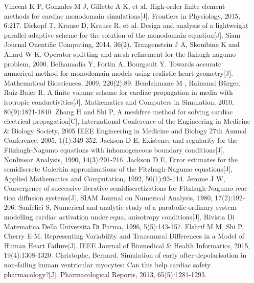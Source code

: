 \documentclass[twoside,UTF8]{nputhesis}
\begin{document}
\begin{thebibliography}{99}
	Vincent K P, Gonzales M J, Gillette A K, et al. High-order finite element methods for cardiac monodomain simulations[J]. Frontiers in Physiology, 2015, 6:217.
	Dickopf T, Krause D, Krause R, et al. Design and analysis of a lightweight parallel adaptive scheme for the solution of the monodomain equation[J]. Siam Journal Onentific Computing, 2014, 36(2).
	Trangenstein J A, Skouibine K and Allard W K, Operator splitting and mesh refinement for the ftzhugh-nagumo problem, 2000.
	Belhamadia Y, Fortin A, Bourgault Y. Towards accurate numerical method for monodomain models using realistic heart geometry[J]. Mathematical Biosciences, 2009, 220(2):89.
	Bendahmane M , Raimund Bürger, Ruiz-Baier R. A finite volume scheme for cardiac propagation in media with isotropic conductivities[J]. Mathematics and Computers in Simulation, 2010, 80(9):1821-1840.
	Zhang H and Shi P, A meshfree method for solving cardiac electrical propagation[C], International Conference of the Engineering in Medicine \& Biology Society, 2005 IEEE Engineering in Medicine and Biology 27th Annual Conference, 2005, 1(1):349-352.
	Jackson D E, Existence and regularity for the Fitzhugh-Nagumo equations with inhomogeneous
	boundary conditions[J], Nonlinear Analysis, 1990, 14(3):201-216.
	Jackson D E, Error estimates for the semidiscrete Galerkin approximations of the Fitzhugh-Nagumo equations[J], Applied Mathematics and Computation, 1992, 50(1):93-114.
	Jerome J W, Convergence of successive iterative semidiscretizations for Fitzhugh-Nagumo reac-
	tion diffusion systems[J], SIAM Journal on Numerical Analysis, 1980, 17(2):192-206.
	Sanfelici S, Numerical and analytic study of a parabolic-ordinary system modelling cardiac activation under equal anisotropy conditions[J], Rivista Di Matematica Della Universita Di Parma, 1996, 5(5):143-157.
	Elshrif M M, Shi P, Cherry E M. Representing Variability and Transmural Differences in a Model of Human Heart Failure[J]. IEEE Journal of Biomedical \& Health Informatics, 2015, 19(4):1308-1320.
	Christophe, Bernard. Simulation of early after-depolarisation in non-failing human ventricular myocytes: Can this help cardiac safety pharmacology?[J]. Pharmacological Reports, 2013, 65(5):1281-1293.
	

\end{thebibliography}
\end{document}
